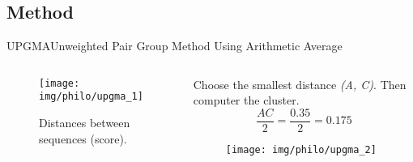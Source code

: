\documentclass[10pt]{beamer}
\newcommand{\1}{
	\setbeamertemplate{background}{
		\texttt{[image: img/1]}
		\tikz[overlay] \fill[fill opacity=0.75,fill=white] (0,0) rectangle (-\paperwidth,\paperheight);
	}
}
\begin{document}
\subsection{Method}

\begin{frame}{UPGMA}{Unweighted Pair Group Method Using Arithmetic Average}
	\begin{columns}
		\begin{column}{0.48\textwidth}
			\begin{figure}
				\texttt{[image: img/philo/upgma\_1]}
				\caption{Distances between sequences (score).}
			\end{figure}
		\end{column}
		\begin{column}{0.48\textwidth}
			
			Choose the smallest distance \textit{(A, C)}. Then computer the cluster.\\ 
			
			\begin{equation*}
				\frac{AC}{2} = \frac{0.35}{2} = 0.175
			\end{equation*}			
			
			\begin{figure}
				\texttt{[image: img/philo/upgma\_2]}
			\end{figure}
			
		\end{column}
	\end{columns}

\end{frame}
\end{document}
